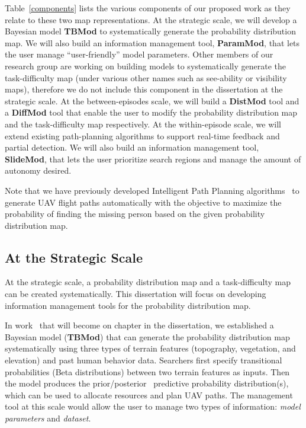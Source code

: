 Table~\ref{components} lists the various components of our proposed work as they relate to these two map representations. At the strategic scale, we will develop a Bayesian model \textbf{TBMod} to systematically generate the probability distribution map. We will also build an information management tool, \textbf{ParamMod}, that lets the user manage ``user-friendly'' model parameters. Other members of our research group are working on building models to systematically generate the task-difficulty map (under various other names such as see-ability or visibility maps), therefore we do not include this component in the dissertation at the strategic scale. At the between-episodes scale, we will build a \textbf{DistMod} tool and a \textbf{DiffMod} tool that enable the user to modify the probability distribution map and the task-difficulty map respectively. At the within-episode scale, we will extend existing path-planning algorithms to support real-time feedback and partial detection. We will also build an information management tool, \textbf{SlideMod}, that lets the user prioritize search regions and manage the amount of autonomy desired.

Note that we have previously developed Intelligent Path Planning algorithms~\cite{Lin2009UAV} to generate UAV flight paths automatically with the objective to maximize the probability of finding the missing person based on the given probability distribution map.


\subsection{At the Strategic Scale}

At the strategic scale, a probability distribution map and a task-difficulty map can be created systematically. This dissertation will focus on developing information management tools for the probability distribution map. 

In work~\cite{Lin2010Bayesian} that will become on chapter in the dissertation, we established a Bayesian model (\textbf{TBMod}) that can generate the probability distribution map systematically using three types of terrain features (topography, vegetation, and elevation) and past human behavior data. Searchers first specify transitional probabilities (Beta distributions) between two terrain features as inputs. Then the model produces the prior/posterior~\cite{Russell2009Artificial} predictive probability distribution(s), which can be used to allocate resources and plan UAV paths. The management tool at this scale would allow the user to manage two types of information: \textit{model parameters} and \textit{dataset}.

